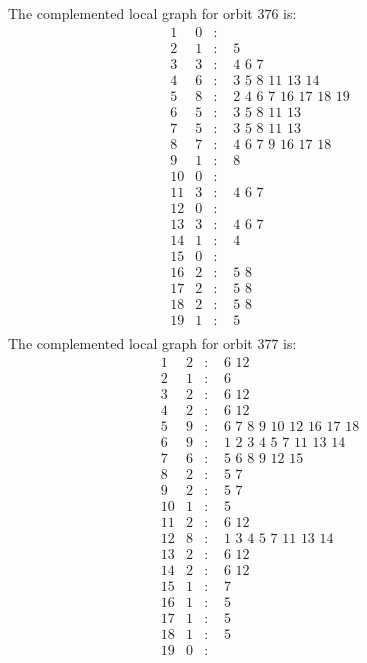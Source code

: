 \documentclass[12pt]{article}
\begin{document}
The complemented local graph for orbit $376$ is:
\begin{equation*}
\begin{array}{rrcl}
1&0&:&\\
2&1&:&\,\,5\\
3&3&:&\,\,4\,\,6\,\,7\\
4&6&:&\,\,3\,\,5\,\,8\,\,11\,\,13\,\,14\\
5&8&:&\,\,2\,\,4\,\,6\,\,7\,\,16\,\,17\,\,18\,\,19\\
6&5&:&\,\,3\,\,5\,\,8\,\,11\,\,13\\
7&5&:&\,\,3\,\,5\,\,8\,\,11\,\,13\\
8&7&:&\,\,4\,\,6\,\,7\,\,9\,\,16\,\,17\,\,18\\
9&1&:&\,\,8\\
10&0&:&\\
11&3&:&\,\,4\,\,6\,\,7\\
12&0&:&\\
13&3&:&\,\,4\,\,6\,\,7\\
14&1&:&\,\,4\\
15&0&:&\\
16&2&:&\,\,5\,\,8\\
17&2&:&\,\,5\,\,8\\
18&2&:&\,\,5\,\,8\\
19&1&:&\,\,5\\
\end{array}
\end{equation*}
The complemented local graph for orbit $377$ is:
\begin{equation*}
\begin{array}{rrcl}
1&2&:&\,\,6\,\,12\\
2&1&:&\,\,6\\
3&2&:&\,\,6\,\,12\\
4&2&:&\,\,6\,\,12\\
5&9&:&\,\,6\,\,7\,\,8\,\,9\,\,10\,\,12\,\,16\,\,17\,\,18\\
6&9&:&\,\,1\,\,2\,\,3\,\,4\,\,5\,\,7\,\,11\,\,13\,\,14\\
7&6&:&\,\,5\,\,6\,\,8\,\,9\,\,12\,\,15\\
8&2&:&\,\,5\,\,7\\
9&2&:&\,\,5\,\,7\\
10&1&:&\,\,5\\
11&2&:&\,\,6\,\,12\\
12&8&:&\,\,1\,\,3\,\,4\,\,5\,\,7\,\,11\,\,13\,\,14\\
13&2&:&\,\,6\,\,12\\
14&2&:&\,\,6\,\,12\\
15&1&:&\,\,7\\
16&1&:&\,\,5\\
17&1&:&\,\,5\\
18&1&:&\,\,5\\
19&0&:&\\
\end{array}
\end{equation*}
\end{document}
